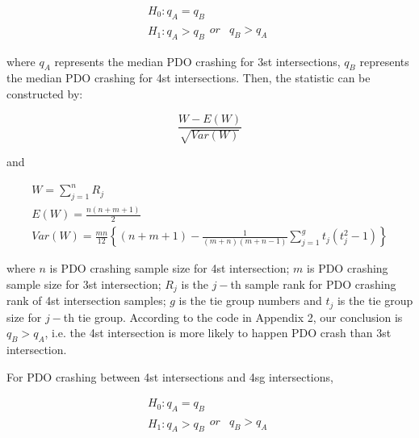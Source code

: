 \documentclass[11pt]{scrartcl} %
\begin{document}
\begin{equation*}
\begin{array}{l}
{H_0}:{q_A} = {q_B}\\
{H_1}:{q_A} > {q_B}\begin{array}{*{20}{c}}
{or}&{{q_B} > {q_A}}
\end{array}
\end{array}
\end{equation*}

where ${q_A}$ represents the median PDO crashing for 3st intersections, $q_B$ represents the median PDO crashing for 4st intersections. Then, the statistic can be constructed by:

\begin{equation*}
\frac{{W - E\left( W \right)}}{{\sqrt {Var\left( W \right)} }}
\end{equation*}

and

\begin{equation}
\label{mw-stat}
\begin{array}{l}
W = \sum\limits_{j = 1}^n {{R_j}} \\
E\left( W \right) = \frac{{n\left( {n + m + 1} \right)}}{2}\\
Var\left( W \right) = \frac{{mn}}{{12}}\left\{ {\left( {n + m + 1} \right) - \frac{1}{{\left( {m + n} \right)\left( {m + n - 1} \right)}}\sum\limits_{j = 1}^g {{t_j}\left( {t_j^2 - 1} \right)} } \right\}
\end{array}
\end{equation}

where $n$ is PDO crashing sample size for 4st intersection; $m$ is PDO crashing sample size for 3st intersection; $R_j$ is the $j-$th sample rank for PDO crashing rank of 4st intersection samples; $g$ is the tie group numbers and $t_j$ is the tie group size for $j-$th tie group. According to the code in Appendix 2, our conclusion is ${{q_B} > {q_A}}$, i.e. the 4st intersection is more likely to happen PDO crash than 3st intersection.

\par

For PDO crashing between 4st intersections and 4sg intersections,

\begin{equation*}
\begin{array}{l}
{H_0}:{q_A} = {q_B}\\
{H_1}:{q_A} > {q_B}\begin{array}{*{20}{c}}
{or}&{{q_B} > {q_A}}
\end{array}
\end{array}
\end{equation*}
\end{document}
